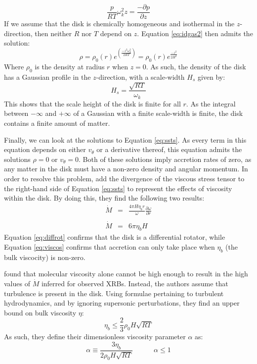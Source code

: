 \begin{equation}
\frac{p}{RT}\omega_k^2 z=\frac{-\partial p}{\partial z}\label{eq:idgas2}
\end{equation}
If we assume that the disk is chemically homogeneous and isothermal in the $z$-direction, then neither $R$ nor $T$ depend on $z$.  Equation \ref{eq:idgas2} then admits the solution:
\begin{equation}
\rho=\rho_0(r)e^{\left(\frac{-z^2\omega_k^2}{2RT}\right)}=\rho_0(r)e^{\frac{-z^2}{2H^2}}
\end{equation}
Where $\rho_0$ is the density at radius $r$ when $z=0$.  As such, the density of the disk has a Gaussian profile in the $z$-direction, with a scale-width $H_s$ given by:
\begin{equation}
H_s=\frac{\sqrt{RT}}{\omega_k}
\end{equation}
This shows that the scale height of the disk is finite for all $r$.  As the integral between $-\infty$ and $+\infty$ of a Gaussian with a finite scale-width is finite, the disk contains a finite amount of matter.
\par Finally, we can look at the solutions to Equation \ref{eq:ssts}.  As every term in this equation depends on either $v_\theta$ or a derivative thereof, this equation admits the solutions $\rho=0$ or $v_\theta=0$.  Both of these solutions imply accretion rates of zero, as any matter in the disk must have a non-zero density and angular momentum.  In order to resolve this problem, \citet{Shakura_Disk} add the divergence of the viscous stress tensor \citep{Landau_Tensor} to the right-hand side of Equation \ref{eq:ssts} to represent the effects of viscosity within the disk.  By doing this, they find the following two results:
\begin{eqnarray}
\dot{M}&=&\frac{4\pi H\eta_b r}{\omega}\frac{\partial\omega}{\partial r}\label{eq:diffrot}\\\nonumber\\
\dot{M}&=&6\pi\eta_b H\label{eq:viscos}
\end{eqnarray}
Equation \ref{eq:diffrot} confirms that the disk is a differential rotator, while Equation \ref{eq:viscos} confirms that accretion can only take place when $\eta_b$ (the bulk viscocity) is non-zero.
\par \citet{Shakura_Disk} found that molecular viscosity alone cannot be high enough to result in the high values of $\dot{M}$ inferred for observed XRBs.  Instead, the authors assume that turbulence is present in the disk.  Using formulae pertaining to turbulent hydrodynamics, and by ignoring supersonic perturbations, they find an upper bound on bulk viscosity $\eta$:
\begin{equation}
\eta_b\leq\frac{2}{3}\rho_0H\sqrt{RT}
\end{equation}
As such, they define their dimensionless viscosity parameter $\alpha$ as:
\begin{equation}
\alpha\equiv\frac{3\eta_b}{2\rho_0H\sqrt{RT}}\quad\quad\quad\alpha\leq1
\end{equation}

